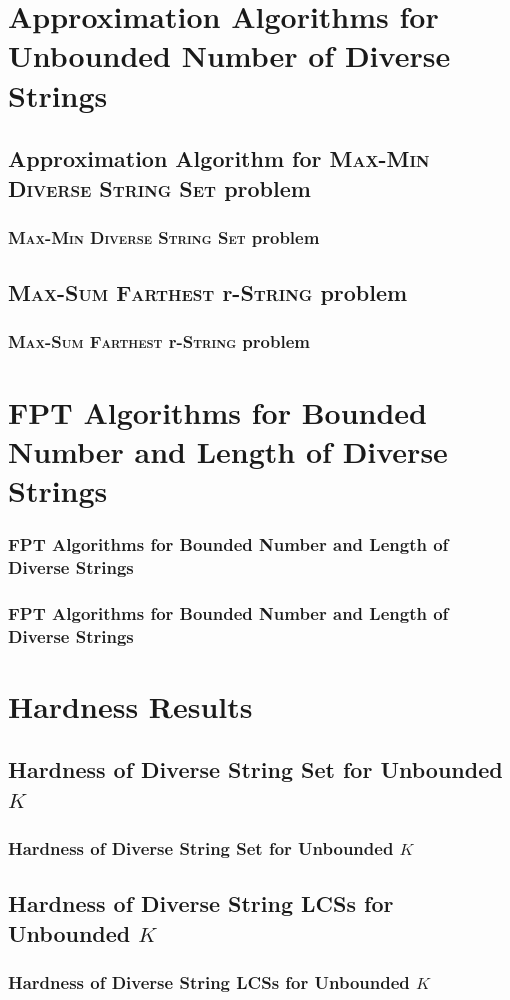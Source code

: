 \documentclass{beamer}
\begin{document}
\section{Approximation Algorithms for Unbounded Number of Diverse Strings}
\subsection{Approximation Algorithm for \textsc{Max-Min Diverse String Set} problem}
\begin{frame}
    \frametitle{\textsc{Max-Min Diverse String Set} problem}

\end{frame}

\subsection{\textsc{Max-Sum Farthest} r-\textsc{String} problem}
\begin{frame}
    \frametitle{\textsc{Max-Sum Farthest} r-\textsc{String} problem}
\end{frame}

\section{FPT Algorithms for Bounded Number and Length of Diverse Strings}
\begin{frame}
    \frametitle{FPT Algorithms for Bounded Number and Length of Diverse Strings}



\end{frame}

\begin{frame}
    \frametitle{FPT Algorithms for Bounded Number and Length of Diverse Strings}



\end{frame}

\section{Hardness Results}
\subsection{Hardness of Diverse String Set for Unbounded $K$}
\begin{frame}
    \frametitle{Hardness of Diverse String Set for Unbounded $K$}

\end{frame}

\subsection{Hardness of Diverse String LCSs for Unbounded $K$}
\begin{frame}
    \frametitle{Hardness of Diverse String LCSs for Unbounded $K$}

\end{frame}
\end{document}
